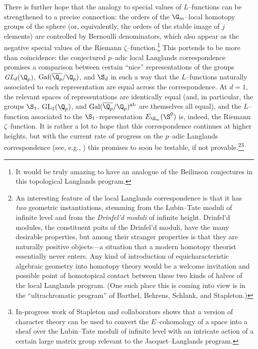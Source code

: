 There is further hope that the analogy to special values of \(L\)--functions can be strengthened to a precise connection: the orders of the \(\G_m\)--local homotopy groups of the sphere (or, equivalently, the orders of the stable image of \(j\) elements) are controlled by Bernoulli denominators, which also appear as the negative special values of the Riemann \(\zeta\)--function.\footnote{It would be truly amazing to have an analogue of the Beilinson conjectures in this topological Langlands program.}  This portends to be more than coincidence: the conjectured \(p\)--adic local Langlands correspondence promises a comparison between certain ``nice'' representations of the groups \(\mathit{GL}_d(\Q_p)\), \(\operatorname{Gal}(\overline{\Q_p} / \Q_p)\), and \(\S_d\) in such a way that the \(L\)--functions naturally associated to each representation are equal across the correspondence.  At \(d = 1\), the relevant spaces of representations are identically equal (and, in particular, the groups \(\S_1\), \(\mathrm{GL}_1(\Q_p)\), and \(\operatorname{Gal}(\overline{\Q_p} / \Q_p)^{\mathrm{ab}}\) are themselves all equal), and the \(L\)--function associated to the \(\S_1\)--representation \(E_{\G_m}(\S^0)\) is, indeed, the Riemann \(\zeta\)--function.  It is rather a lot to hope that this correspondence continues at higher heights, but with the current rate of progress on the \(p\)--adic Langlands correspondence (see, e.g., \cite{KnightThesis}) this promises to soon be testable, if not provable.\footnote{An interesting feature of the local Langlands correspondence is that it has \emph{two} geometric instantiations, stemming from the Lubin--Tate moduli of infinite level and from the \emph{Drinfel'd moduli} of infinite height.  Drinfel'd modules, the constituent poits of the Drinfel'd moduli, have the many desirable properties, but among their stranger properties is that they are naturally positive objects---a situation that a modern homotopy theorist essentially never enters.  Any kind of introduction of equicharacteristic algebraic geometry into homotopy theory would be a welcome invitation and possible point of homotopical contact between these two kinds of halves of the local Langlands program.  (One such place this is coming into view is in the ``ultrachromatic program'' of Barthel, Behrens, Schlank, and Stapleton.)}\footnote{In-progress work of Stapleton and collaborators shows that a version of character theory can be used to convert the $E$--cohomology of a space into a sheaf over the Lubin--Tate moduli of infinite level with an intricate action of a certain large matrix group relevant to the Jacquet--Langlands program.}







